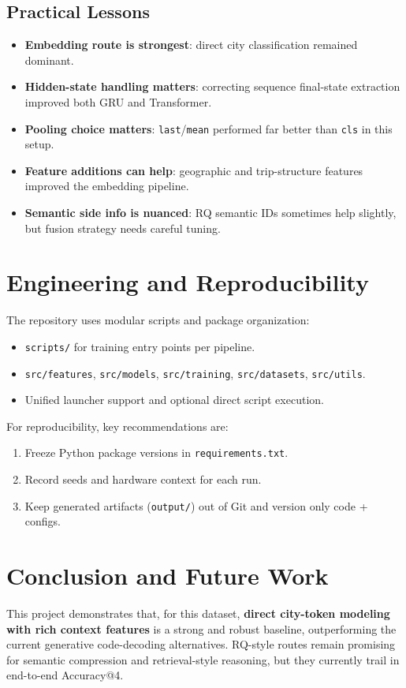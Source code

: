 \documentclass[11pt]{article}
\begin{document}
\subsection{Practical Lessons}
\begin{itemize}[leftmargin=1.5em]
    \item \textbf{Embedding route is strongest}: direct city classification remained dominant.
    \item \textbf{Hidden-state handling matters}: correcting sequence final-state extraction improved both GRU and Transformer.
    \item \textbf{Pooling choice matters}: \texttt{last}/\texttt{mean} performed far better than \texttt{cls} in this setup.
    \item \textbf{Feature additions can help}: geographic and trip-structure features improved the embedding pipeline.
    \item \textbf{Semantic side info is nuanced}: RQ semantic IDs sometimes help slightly, but fusion strategy needs careful tuning.
\end{itemize}

\section{Engineering and Reproducibility}
The repository uses modular scripts and package organization:
\begin{itemize}[leftmargin=1.5em]
    \item \texttt{scripts/} for training entry points per pipeline.
    \item \texttt{src/features}, \texttt{src/models}, \texttt{src/training}, \texttt{src/datasets}, \texttt{src/utils}.
    \item Unified launcher support and optional direct script execution.
\end{itemize}

For reproducibility, key recommendations are:
\begin{enumerate}[leftmargin=1.5em]
    \item Freeze Python package versions in \texttt{requirements.txt}.
    \item Record seeds and hardware context for each run.
    \item Keep generated artifacts (\texttt{output/}) out of Git and version only code + configs.
\end{enumerate}

\section{Conclusion and Future Work}
This project demonstrates that, for this dataset, \textbf{direct city-token modeling with rich context features} is a strong and robust baseline, outperforming the current generative code-decoding alternatives. RQ-style routes remain promising for semantic compression and retrieval-style reasoning, but they currently trail in end-to-end Accuracy@4.
\end{document}
